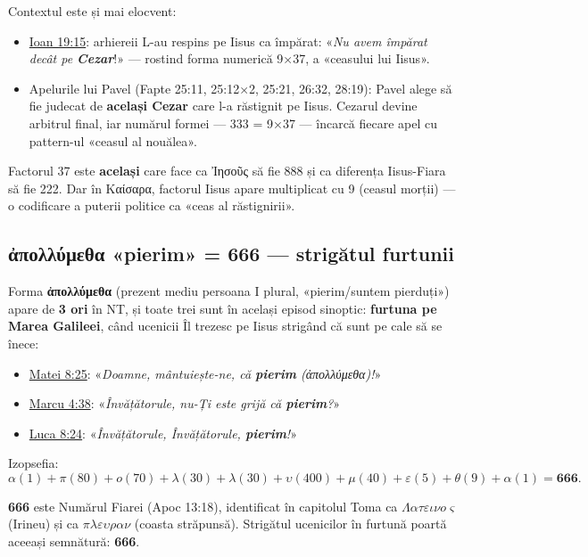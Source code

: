 \documentclass[12pt,a4paper,twoside,openany]{book}
\begin{document}
Contextul este și mai elocvent:
\begin{itemize}
  \item \href{https://bibliaortodoxa.ro/carte.php?id=35\&cap=19\#15}{Ioan 19:15}: arhiereii L-au respins pe Iisus ca împărat: «\textit{Nu avem împărat decât pe \textbf{Cezar}}!» — rostind forma numerică 9×37, a «ceasului lui Iisus».
  \item Apelurile lui Pavel (Fapte 25:11, 25:12×2, 25:21, 26:32, 28:19): Pavel alege să fie judecat de \textbf{același Cezar} care l-a răstignit pe Iisus. Cezarul devine arbitrul final, iar numărul formei — 333 = 9×37 — încarcă fiecare apel cu pattern-ul «ceasul al nouălea».
\end{itemize}

Factorul 37 este \textbf{același} care face ca Ἰησοῦς să fie 888 și ca diferența Iisus-Fiara să fie 222. Dar în Καίσαρα, factorul Iisus apare multiplicat cu 9 (ceasul morții) — o codificare a puterii politice ca «ceas al răstignirii».

\subsection{\texorpdfstring{ἀπολλύμεθα}{apollymetha} «pierim» = 666 — strigătul furtunii}
\label{sec:apollymetha}

Forma \textbf{ἀπολλύμεθα} (prezent mediu persoana I plural, «pierim/suntem pierduți») apare de \textbf{3 ori} în NT, și toate trei sunt în același episod sinoptic: \textbf{furtuna pe Marea Galileei}, când ucenicii Îl trezesc pe Iisus strigând că sunt pe cale să se înece:

\begin{itemize}
  \item \href{https://bibliaortodoxa.ro/carte.php?id=55\&cap=8\#25}{Matei 8:25}: «\textit{Doamne, mântuiește-ne, că \textbf{pierim} (ἀπολλύμεθα)!}»
  \item \href{https://bibliaortodoxa.ro/carte.php?id=53\&cap=4\#38}{Marcu 4:38}: «\textit{Învățătorule, nu-Ți este grijă că \textbf{pierim}?}»
  \item \href{https://bibliaortodoxa.ro/carte.php?id=48\&cap=8\#24}{Luca 8:24}: «\textit{Învățătorule, Învățătorule, \textbf{pierim}!}»
\end{itemize}

Izopsefia:
\[
\alpha(1) + \pi(80) + o(70) + \lambda(30) + \lambda(30) + \upsilon(400) + \mu(40) + \varepsilon(5) + \theta(9) + \alpha(1) = \mathbf{666}.
\]

\textbf{666} este Numărul Fiarei (Apoc 13:18), identificat în capitolul Toma ca $\Lambda\alpha\tau\varepsilon\iota\nu o\varsigma$ (Irineu) și ca $\pi\lambda\varepsilon\upsilon\rho\alpha\nu$ (coasta străpunsă). Strigătul ucenicilor în furtună poartă aceeași semnătură: \textbf{666}.
\end{document}
